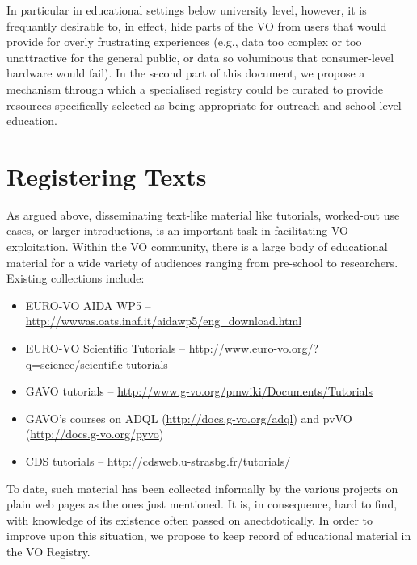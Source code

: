 \documentclass{ivoa}
\begin{document}
In particular in educational settings below university level, however,
it is frequantly desirable to, in effect, hide parts of the VO from
users that would provide for overly frustrating experiences (e.g., data
too complex or too unattractive for the general public, or data so
voluminous that consumer-level hardware would fail).  In the second part
of this document, we propose a mechanism through which a specialised
registry could be curated to provide resources specifically selected as
being appropriate for outreach and school-level education.


\section{Registering Texts}

\label{sect:regext}

As argued above, disseminating text-like material
like tutorials, worked-out use cases, or larger introductions,
is an important task in facilitating VO exploitation.  
Within the VO community, there is a large body of
educational material for a wide variety of audiences ranging from pre-school to
researchers.  Existing collections include:

\begin{itemize}

\item EURO-VO AIDA WP5 -- \url{http://wwwas.oats.inaf.it/aidawp5/eng_download.html}

\item EURO-VO Scientific Tutorials -- \url{http://www.euro-vo.org/?q=science/scientific-tutorials}

\item GAVO tutorials --
\url{http://www.g-vo.org/pmwiki/Documents/Tutorials}

\item GAVO's courses on ADQL (\url{http://docs.g-vo.org/adql}) and pvVO
(\url{http://docs.g-vo.org/pyvo})

\item CDS tutorials -- \url{http://cdsweb.u-strasbg.fr/tutorials/}
\end{itemize}


To date, such material has been collected informally by the various
projects on plain web pages as the ones just mentioned.  
It is, in consequence, hard to find, with
knowledge of its existence often passed on anectdotically. In order to improve upon 
this situation, we
propose to keep record of educational material in the VO Registry.
\end{document}
